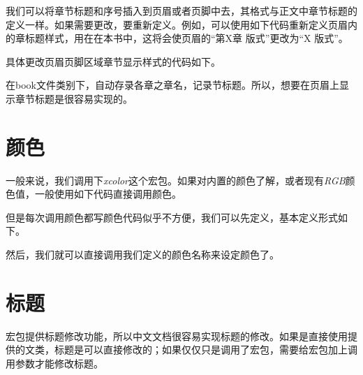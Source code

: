 我们可以将章节标题和序号插入到页眉或者页脚中去，其格式与正文中章节标题的定义一样。如果需要更改，要重新定义。例如，可以使用如下代码重新定义页眉内的章标题样式，用在在本书中，这将会使页眉的“第X章 版式”更改为“X 版式”。 

具体更改页眉页脚区域章节显示样式的代码如下。

\begin{latex}
\renewcommand{\chaptermark}[1]{\markleft{\thesection.\#1}}
\renewcommand{\chaptermark}[1]{\markboth{\thechapter.\ #1}{节样式空置表示修改章样式}}
\renewcommand{\chaptermark}[1]{\markboth{章样式}{节样式}}
\end{latex}

在book文件类别下，\emph{\leftmark}自动存录各章之章名，\emph{\rightmark}记录节标题。所以，想要在页眉上显示章节标题是很容易实现的。

\begin{latex}
\lhead{\leftmark}%
\rhead{\rightmark}%
\end{latex}

\section{颜色}
一般来说，我们调用下\emph{xcolor}这个宏包。如果对内置的颜色了解，或者现有\emph{RGB}颜色值，一般使用如下代码直接调用颜色。

\begin{center}
\color[RGB]{204, 128, 92}{Color Text中文测试}
\end{center}

\begin{latex}
\color[RGB]{204, 128, 92}{Color Text中文测试}
\end{latex}

但是每次调用颜色都写颜色代码似乎不方便，我们可以先定义，基本定义形式如下。
\begin{latex}
\usepackage{xcolor}%
\end{latex}

然后，我们就可以直接调用我们定义的颜色名称来设定颜色了。

\begin{center}
\end{center}

\begin{latex}
\color{keyword}{\slshape function, return, if, true, false}
\end{latex}

\section{标题}

\CTeX 宏包提供标题修改功能，所以中文文档很容易实现标题的修改。如果是直接使用\CTeX 提供的文类，标题是可以直接修改的；如果仅仅只是调用了\CTeX 宏包，需要给宏包加上调用参数才能修改标题。

\begin{latex}
\usepackage[
    heading=true,%
]{ctex}
\end{latex}